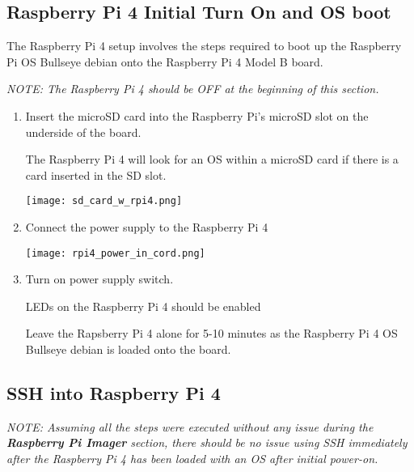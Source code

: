 \documentclass[journal]{IEEEtran}
\begin{document}
    \subsection{Raspberry Pi 4 Initial Turn On and OS boot}

    The Raspberry Pi 4 setup involves the steps required to boot up the Raspberry Pi OS Bullseye debian onto the Raspberry Pi 4 Model B board.

    \emph{NOTE: The Raspberry Pi 4 should be OFF at the beginning of this section.} \newline


    \begin{enumerate}
        \item Insert the microSD card into the Raspberry Pi's microSD slot on the underside of the board. \newline 
        
        The Raspberry Pi 4 will look for an OS within a microSD card if there is a card inserted in the SD slot. \newline

        \texttt{[image: sd\_card\_w\_rpi4.png]}

        \item Connect the power supply to the Raspberry Pi 4 \newline
        
        \texttt{[image: rpi4\_power\_in\_cord.png]}

        \item Turn on power supply switch. \newline
        
        LEDs on the Raspberry Pi 4 should be enabled \newline

        Leave the Rapsberry Pi 4 alone for 5-10 minutes as the Raspberry Pi 4 OS Bullseye debian is loaded onto the board.

    \end{enumerate}

    \subsection{SSH into Raspberry Pi 4}

    \emph{NOTE: Assuming all the steps were executed without any issue during the \textbf{Raspberry Pi Imager} section, there should be no issue using SSH immediately after the Raspberry Pi 4 has been loaded with an OS after initial power-on.} \newline
\end{document}
